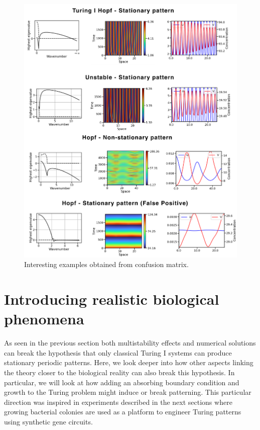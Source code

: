 \begin{figure}[H] %
    \centering
    \begin{adjustbox}{center}
        \includegraphics[width=1.2\textwidth]{chapters/Chapter 1/interesting_cases_nogrowth} %
    \end{adjustbox}
    \caption{Interesting examples obtained from confusion matrix. }
    \label{fig:interesting_cases_nogrowth} %
\end{figure}
\section{Introducing realistic biological phenomena}
As seen in the previous section both multistability effects and numerical solutions can break the hypothesis that only classical Turing I systems can produce stationary periodic patterns.
Here, we look deeper into how other aspects linking the theory closer to the biological reality can also break this hypothesis.
In particular, we will look at how adding an absorbing boundary condition and growth to the Turing problem might induce or break patterning.
This particular direction was inspired in experiments described in the next sections where growing bacterial colonies are used as a platform to engineer Turing patterns using synthetic gene circuits.

